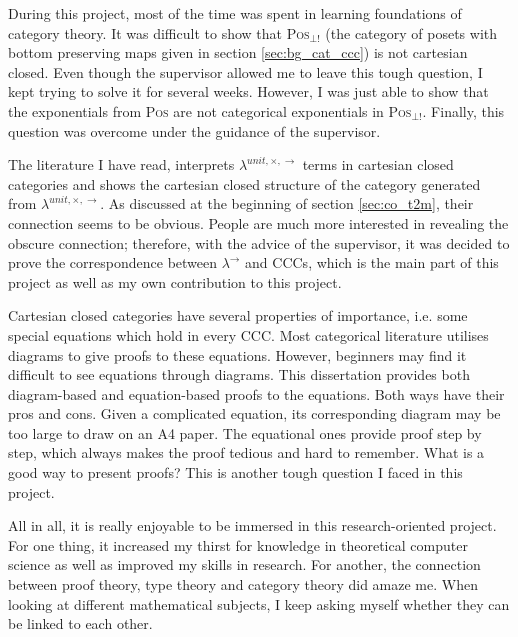 During this project, most of the time was spent in learning foundations of category theory. It was difficult to show that \textsc{Pos}$_{\bot !}$ (the category of posets with bottom preserving maps given in section \ref{sec:bg_cat_ccc}) is not cartesian closed. Even though the supervisor allowed me to leave this tough question, I kept trying to solve it for several weeks. However, I was just able to show that the exponentials from \textsc{Pos} are not categorical exponentials in \textsc{Pos}$_{\bot !}$. Finally, this question was overcome under the guidance of the supervisor.

The literature \cite{AL91,BW95,LS86,Mit96} I have read, interprets $ \lambda^{unit,\times,\to} $ terms in cartesian closed categories and shows the cartesian closed structure of the category generated from $ \lambda^{unit,\times,\to} $. As discussed at the beginning of section \ref{sec:co_t2m}, their connection seems to be obvious. People are much more interested in revealing the obscure connection; therefore, with the advice of the supervisor, it was decided to prove the correspondence between $ \lambda^{\to} $ and CCCs, which is the main part of this project as well as my own contribution to this project.

Cartesian closed categories have several properties of importance, i.e. some special equations which hold in every CCC. Most categorical literature utilises diagrams to give proofs to these equations. However, beginners may find it difficult to see equations through diagrams. This dissertation provides both diagram-based and equation-based proofs to the equations. Both ways have their pros and cons. Given a complicated equation, its corresponding diagram may be too large to draw on an A4 paper. The equational ones provide proof step by step, which always makes the proof tedious and hard to remember. What is a good way to present proofs? This is another tough question I faced in this project.

All in all, it is really enjoyable to be immersed in this research-oriented project. For one thing, it increased my thirst for knowledge in theoretical computer science as well as improved my skills in research. For another, the connection between proof theory, type theory and category theory did amaze me. When looking at different mathematical subjects, I keep asking myself whether they can be linked to each other.